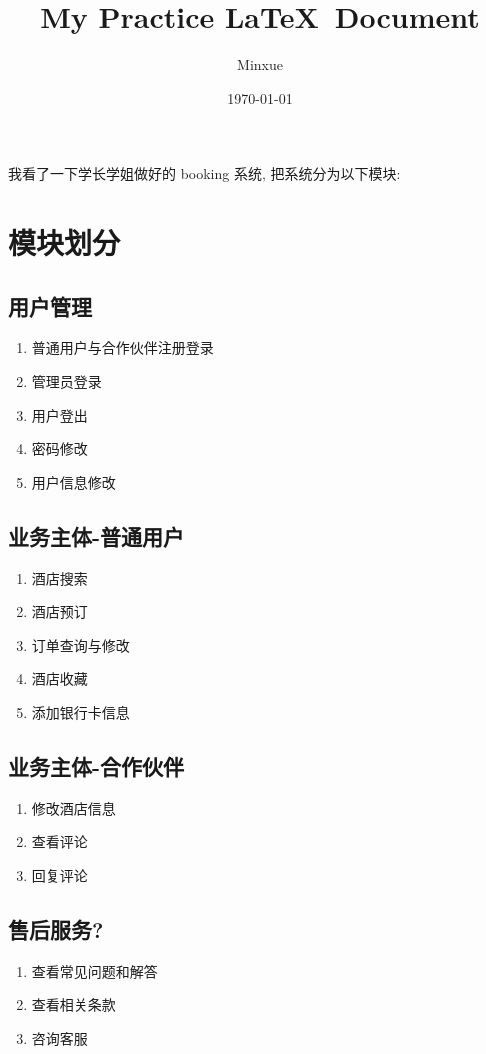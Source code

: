 \documentclass[18pt]{article}
\begin{document}
\tableofcontents
\title{My Practice \LaTeX \ Document}
\author{Minxue}
\date{\today}
\maketitle

我看了一下学长学姐做好的 booking 系统, 
把系统分为以下模块: 
\section{模块划分}

	\subsection{用户管理}
	\begin{enumerate}
		\item 普通用户与合作伙伴注册登录
		\item 管理员登录
		\item 用户登出
		\item 密码修改
		\item 用户信息修改
	\end{enumerate}
	
	\subsection{业务主体-普通用户}
	\begin{enumerate}
		\item 酒店搜索
		\item 酒店预订
		\item 订单查询与修改
		\item 酒店收藏
		\item 添加银行卡信息
	\end{enumerate}
	
	\subsection{业务主体-合作伙伴}
	\begin{enumerate}
		\item 修改酒店信息
		\item 查看评论
		\item 回复评论
	\end{enumerate}
	
	\subsection{售后服务?}
	\begin{enumerate}
		\item 查看常见问题和解答
		\item 查看相关条款
		\item 咨询客服
	\end{enumerate}
	
\end{document}
